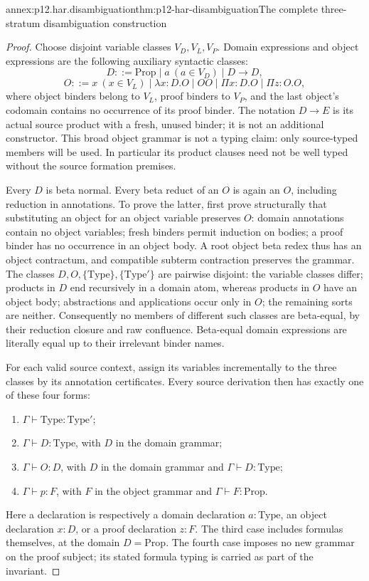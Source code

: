 \begin{annexitem}{annex:p12.har.disambiguation}{thm:p12-har-disambiguation}{The complete three-stratum disambiguation construction}
\begin{proof}
Choose disjoint variable classes \(V_D,V_L,V_P\). Domain expressions and
object expressions are the following auxiliary syntactic classes:
\[
 D ::= \mathrm{Prop}\mid a\ (a\in V_D)\mid D\to D,
\]
\[
 O ::= x\ (x\in V_L)\mid\lambda x:D.O\mid OO
       \mid\Pi x:D.O\mid\Pi z:O.O,
\]
where object binders belong to \(V_L\), proof binders to \(V_P\), and
the last object's codomain contains no occurrence of its proof binder.
The notation \(D\to E\) is its actual source product with a fresh,
unused binder; it is not an additional constructor. This broad object
grammar is not a typing claim: only source-typed members will be used.
In particular its product clauses need not be well typed without the
source formation premises.

Every \(D\) is beta normal. Every beta reduct of an \(O\) is again an
\(O\), including reduction in annotations. To prove the latter, first
prove structurally that substituting an object for an object variable
preserves \(O\): domain annotations contain no object variables;
fresh binders permit induction on bodies; a proof binder has no occurrence
in an object body. A root object beta redex thus has an object contractum,
and compatible subterm contraction preserves the grammar. The classes
\(D,O,\{\mathrm{Type}\},\{\mathrm{Type}'\}\) are pairwise disjoint:
the variable classes differ; products in \(D\) end recursively in a
domain atom, whereas products in \(O\) have an object body; abstractions
and applications occur only in \(O\); the remaining sorts are neither.
Consequently no members of different such classes are beta-equal, by
their reduction closure and raw confluence. Beta-equal domain expressions
are literally equal up to their irrelevant binder names.

For each valid source context, assign its variables incrementally to the
three classes by its annotation certificates. Every source derivation
then has exactly one of these four forms:
\begin{enumerate}
\item \(\Gamma\vdash\mathrm{Type}:\mathrm{Type}'\);
\item \(\Gamma\vdash D:\mathrm{Type}\), with \(D\) in the domain grammar;
\item \(\Gamma\vdash O:D\), with \(D\) in the domain grammar and
      \(\Gamma\vdash D:\mathrm{Type}\);
\item \(\Gamma\vdash p:F\), with \(F\) in the object grammar and
      \(\Gamma\vdash F:\mathrm{Prop}\).
\end{enumerate}
Here a declaration is respectively a domain declaration \(a:\mathrm{Type}\),
an object declaration \(x:D\), or a proof declaration \(z:F\).
The third case includes formulas themselves, at the domain
\(D=\mathrm{Prop}\). The fourth case imposes no new grammar on the
proof subject; its stated formula typing is carried as part of the invariant.


\end{proof}
\end{annexitem}
